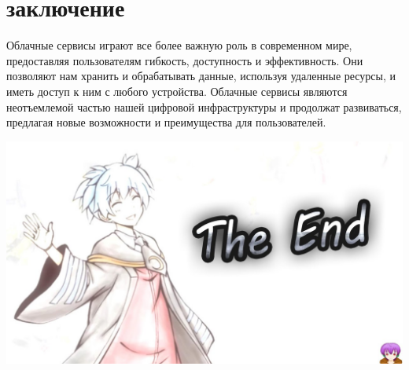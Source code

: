 \documentclass{beamer}
\begin{document}
    
    
    \section{заключение}
    \begin{frame}
        \Large Облачные сервисы играют все более важную роль в современном мире, предоставляя пользователям гибкость, доступность и эффективность. Они позволяют нам хранить и обрабатывать данные, используя удаленные ресурсы, и иметь доступ к ним с любого устройства. Облачные сервисы являются неотъемлемой частью нашей цифровой инфраструктуры и продолжат развиваться, предлагая новые возможности и преимущества для пользователей.
    \end{frame}
    


    \begin{frame}
        \centering
        \includegraphics[scale=0.25]{TheEnd.jpg}
    \end{frame}
    
\end{document}
